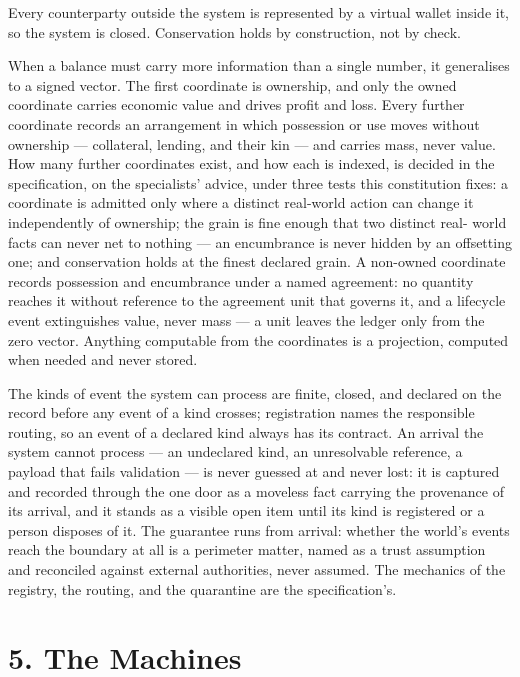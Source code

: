 \documentclass[11pt,a4paper]{article}
\newcommand{\clabel}[1]{\leavevmode\hypertarget{clause-#1}{}%
  \marginpar{\raggedright\scriptsize\ttfamily\textcolor{gray}{#1}}}
\begin{document}
\clabel{C-4.9}Every counterparty outside the system is represented by a virtual wallet
inside it, so the system is closed. Conservation holds by construction,
not by check.

\clabel{C-4.10}When a balance must carry more information than a single
number, it generalises to a signed vector. The first coordinate is
ownership, and only the owned coordinate carries economic value and drives
profit and loss. Every further coordinate records an arrangement in which
possession or use moves without ownership --- collateral, lending, and their
kin --- and carries mass, never value. How many further coordinates exist,
and how each is indexed, is decided in the specification, on the
specialists' advice, under three tests this constitution fixes: a coordinate
is admitted only where a distinct real-world action can change it
independently of ownership; the grain is fine enough that two distinct real-
world facts can never net to nothing --- an encumbrance is never hidden by
an offsetting one; and conservation holds at the finest declared grain.
\clabel{C-4.11}A non-owned coordinate records possession and encumbrance
under a named agreement: no quantity reaches it without reference to the
agreement unit that governs it, and a lifecycle event extinguishes value,
never mass --- a unit leaves the ledger only from the zero vector. Anything computable from the coordinates is a projection, computed when needed and never stored.

\clabel{C-4.12}The kinds of event the system can process are finite,
closed, and declared on the record before any event of a kind crosses;
registration names the responsible routing, so an event of a declared
kind always has its contract. An arrival the system cannot process ---
an undeclared kind, an unresolvable reference, a payload that fails
validation --- is never guessed at and never lost: it is captured and
recorded through the one door as a moveless fact carrying the
provenance of its arrival, and it stands as a visible open item until
its kind is registered or a person disposes of it. The guarantee runs
from arrival: whether the world's events reach the boundary at all is a
perimeter matter, named as a trust assumption and reconciled against
external authorities, never assumed. The mechanics of the registry, the
routing, and the quarantine are the specification's.

\hypertarget{the-machines}{%
\section{5. The Machines}\label{the-machines}}
\end{document}
